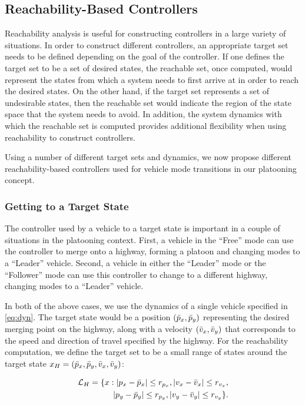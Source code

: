 \subsection{Reachability-Based Controllers \label{sec:reach_ctrl}}
Reachability analysis is useful for constructing controllers in a large variety of situations. In order to construct different controllers, an appropriate target set needs to be defined depending on the goal of the controller. If one defines the target set to be a set of desired states, the reachable set, once computed, would represent the states from which a system needs to first arrive at in order to reach the desired states. On the other hand, if the target set represents a set of undesirable states, then the reachable set would indicate the region of the state space that the system needs to avoid. In addition, the system dynamics with which the reachable set is computed provides additional flexibility when using reachability to construct controllers.

Using a number of different target sets and dynamics, we now propose different reachability-based controllers used for vehicle mode transitions in our platooning concept.

\subsubsection{Getting to a Target State \label{sec:abs_target_ctrl}}
The controller used by a vehicle to a target state is important in a couple of situations in the platooning context. First, a vehicle in the ``Free'' mode can use the controller to merge onto a highway, forming a platoon and changing modes to a ``Leader'' vehicle. Second, a vehicle in either the ``Leader'' mode or the ``Follower'' mode can use this controller to change to a different highway, changing modes to a ``Leader'' vehicle. 

In both of the above cases, we use the dynamics of a single vehicle specified in \eqref{eq:dyn}. The target state would be a position $(\bar{p}_x, \bar{p}_y)$ representing the desired merging point on the highway, along with a velocity $(\bar{v}_x, \bar{v}_y)$ that corresponds to the speed and direction of travel specified by the highway. For the reachability computation, we define the target set to be a small range of states around the target state $x_H = (\bar{p}_x, \bar{p}_y, \bar{v}_x, \bar{v}_y)$:

\begin{equation}
\begin{aligned}
\mathcal{L}_H = \{x: |p_x-\bar{p}_x|\le r_{p_x}, |v_x-\bar{v}_x|\le r_{v_x}, \\
|p_y - \bar{p}_y| \le r_{p_y}, |v_y - \bar{v}_y|\le r_{v_y} \}.
\end{aligned}
\end{equation}

